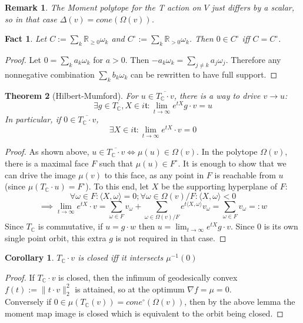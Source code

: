 \documentclass{article}
\newtheorem{theorem}{Theorem}
\newtheorem{corollary}{Corollary}
\newtheorem{fact}[theorem]{Fact}
\newtheorem{remark}{Remark}
\newcommand{\R}{{\mathbb{R}}}
\newcommand{\C}{{\mathbb{C}}}
\begin{document}
\begin{remark}
The Moment polytope for the T action on $V$ just differs by a scalar, so in that case $\Delta(v) = cone(\Omega(v))$. 
\end{remark}

\begin{fact}
Let $C := \sum_{k} \R_{\geq 0} \omega_{k}$ and $C^{\circ} := \sum_{k} \R_{> 0} \omega_{k}$. Then $0 \in C^{\circ}$ iff $C = C^{\circ}$. 
\end{fact}
\begin{proof}
Let $0 = \sum_{k} a_{k} \omega_{k}$ for $a > 0$. Then $- a_{k} \omega_{k} = \sum_{j \neq k} a_{j} \omega_{j}$. Therefore any nonnegative combination $\sum_{k} b_{k} \omega_{k}$ can be rewritten to have full support. 
\end{proof}

\begin{theorem} [Hilbert-Mumford]
For $u \in \overline{T_{\C} \cdot v}$, there is a way to drive $v \to u$:
\[ \exists g \in T_{\C}, X \in i \mathfrak{t}: \lim_{t \to \infty} e^{tX} g \cdot v = u \]
In particular, if $0 \in \overline{T_{\C} \cdot v}$, 
\[ \exists X \in i \mathfrak{t}: \lim_{t \to \infty} e^{tX} \cdot v = 0 \]
\end{theorem}
\begin{proof}
As shown above, $u \in \overline{T_{\C} \cdot v} \iff \mu(u) \in \Omega(v)$. In the polytope $\Omega(v)$, there is a maximal face $F$ such that $\mu(u) \in F^{\circ}$. It is enough to show that we can drive the image $\mu(v)$ to this face, as any point in $F$ is reachable from $u$ (since $\mu(T_{\C} \cdot u) = F^{\circ}$). To this end, let $X$ be the supporting hyperplane of $F$:
\[ \forall \omega \in F: \langle X, \omega \rangle = 0; \forall \omega \in \Omega(v)/F: \langle X, \omega \rangle < 0  \]
\[ \implies \lim_{t \to \infty} e^{tX} \cdot v = \sum_{\omega \in F} v_{\omega} + \sum_{\omega \in \Omega(v)/F} e^{t \langle X, \omega \rangle} v_{\omega} = \sum_{\omega \in F} v_{\omega} =: w \]
Since $T_{\C}$ is commutative, if $u = g \cdot w$ then $u = \lim_{t \to \infty} e^{tX} g \cdot v$. Since $0$ is its own single point orbit, this extra $g$ is not required in that case. 
\end{proof}

\begin{corollary}
$T_{\C} \cdot v$ is closed iff it intersects $\mu^{-1}(0)$
\end{corollary}
\begin{proof}
If $T_{\C} \cdot v$ is closed, then the infimum of geodesically convex $f(t) := \|t \cdot v\|_{2}^{2}$ is attained, so at the optimum $\nabla f = \mu = 0$. 
\\ Conversely if $0 \in \mu(T_{\C}(v)) = cone^{\circ}(\Omega(v))$, then by the above lemma the moment map image is closed which is equivalent to the orbit being closed. 
\end{proof}
\end{document}

